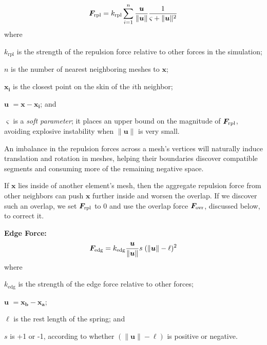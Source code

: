 \begin{equation}
\bm{F}_\mathrm{rpl} = k_\mathrm{rpl} \sum_{i = 1}^{n} \frac{\bm{u}}{\| \bm{u} \| }\frac{1}{\varsigma  +\| \bm{u} \|^2 }
\end{equation}
where 
\begin{packeddescriptions}
	\item[$k_\mathrm{rpl}$]        is the strength of the repulsion force relative to
						other forces in the simulation;
	\item[$n$]        is the number of nearest neighboring meshes to $\bm{x}$; 
	\item[$\bm{x_{i}}$] is the closest point on the skin of the $i$th neighbor;
	\item[$\bm{u}$]  $= \bm{x} - \bm{x_{i}}$; and
	
	
	\item[$\varsigma$]   is a \textit{soft parameter}; it places an upper 
						bound on the magnitude of $\bm{F}_\mathrm{rpl}$, avoiding
						explosive instability when $\| \bm{u} \|$ is very small.
\end{packeddescriptions}

An imbalance in the repulsion forces across a mesh's vertices will
naturally induce translation and rotation in meshes, helping their
boundaries discover compatible segments and consuming more of the
remaining negative space.

If $\bm{x}$ lies inside of another element's mesh, then the aggregate repulsion
force from other neighbors can push $\bm{x}$ further inside and
worsen the overlap.  If we discover such an overlap, we set
$\bm{F}_\mathrm{rpl}$ to $0$ and use the overlap force $\bm{F}_\mathrm{ovr}$, discussed below, to
correct it.

\medskip
\textbf{Edge Force:} 
\begin{equation}
\label{eq_edge_force}
\bm{F}_\mathrm{edg} =  k_\mathrm{edg} \frac{\bm{u}}{\| \bm{u} \|} s \; ( \| \bm{u} \| - \ell)^2
\end{equation}
where
\begin{packeddescriptions}
	\item[$k_\mathrm{edg}$] is the strength of the edge force relative to other forces;
	\item[$\bm{u}$] $= \bm{x_{b}} - \bm{x_{a}}$;
	\item[$\ell$] is the rest length of the spring; and
	\item[$s$] is +1 or -1, according to whether $(\| \bm{u} \| - \ell)$ 
		is positive or negative.
\end{packeddescriptions}

